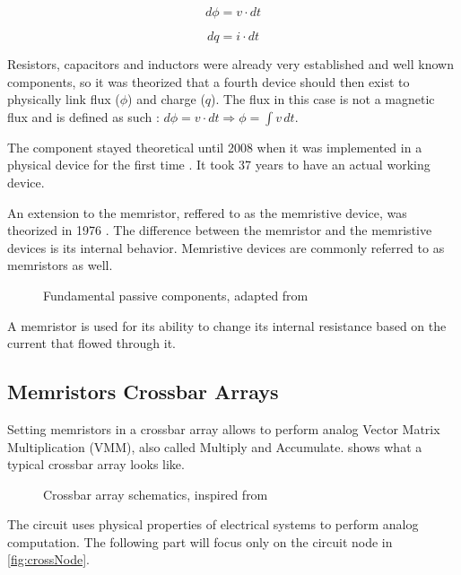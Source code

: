 \begin{equation}
  d\phi = v\cdot dt
\end{equation}

\begin{equation}
  dq = i\cdot dt
\end{equation}

Resistors, capacitors and inductors were already very established and well known components, so it was theorized that a fourth device should then exist to physically link flux ($\phi$) and charge ($q$).  The flux in this case is not a magnetic flux and is defined as such : $ d\phi=v\cdot dt \Rightarrow \phi =  \int v \,dt  $.

The component stayed theoretical until 2008 when it was implemented in a physical device for the first time \cite{memristorFab}. It took 37 years to have an actual working device.

An extension to the memristor, reffered to as the memristive device, was theorized in 1976 \cite{memrestiveDev}. The difference between the memristor and the memristive devices is its internal behavior. Memristive devices are commonly referred to as memristors as well.

\begin{figure}[t]
  \centering
  
  \caption{Fundamental passive components, adapted from \cite{memWiki}}
  \label{fig:fundComp}
\end{figure}

A memristor is used for its ability to change its internal resistance based on the current that flowed through it.

\subsection{Memristors Crossbar Arrays}

Setting memristors in a crossbar array allows to perform analog Vector Matrix Multiplication (VMM), also called Multiply and Accumulate.  shows what a typical crossbar array looks like.

\begin{figure}[b]
  \centering
  
  \caption{Crossbar array schematics, inspired from \cite{xbarFigures}}
  \label{fig:crossbar}
\end{figure}

The circuit uses physical properties of electrical systems to perform analog computation. The following part will focus only on the circuit node in \cref{fig:crossNode}.

